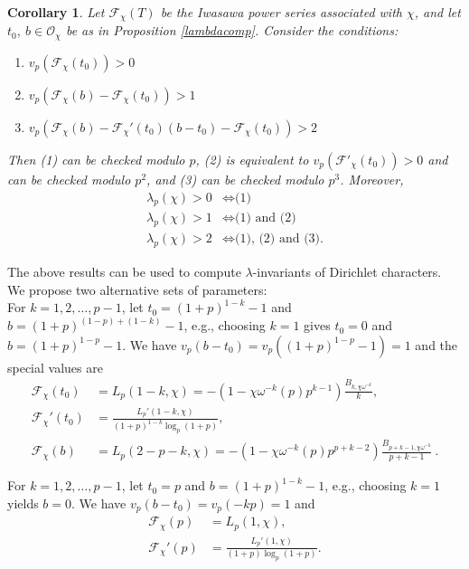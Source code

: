 \documentclass[pdflatex,sn-mathphys-num]{sn-jnl}%
\theoremstyle{plain}
\newtheorem{cor}[thm]{Corollary}
\theoremstyle{definition}
\theoremstyle{remark}
\numberwithin{equation}{section}
\begin{document}
\begin{cor} Let $\mathcal{F}_{\chi}(T)$ be the  Iwasawa power series associated with $\chi$, and let $t_0, \ b \in \mathcal{O}_{\chi}$ be as in Proposition \ref{lambdacomp}.
Consider the conditions:\\
\begin{enumerate}
\item[(1)]   $v_p(\mathcal{F}_{\chi}(t_0)) > 0$ 
\item[(2)] $v_p(\mathcal{F}_{\chi}(b)-\mathcal{F}_{\chi}(t_0)) > 1$
\item[(3)]  $v_p(\mathcal{F}_{\chi}(b)- \mathcal{F}_{\chi}'(t_0) (b-t_0) - \mathcal{F}_{\chi}(t_0)) > 2$
\end{enumerate}
Then (1) can be checked modulo $p$, (2) is equivalent to $v_p(\mathcal{F}'_{\chi}(t_0)) > 0$ and can be checked
modulo $p^2$, and (3) can be checked modulo $p^3$. Moreover,
\begin{align*}
\lambda_p(\chi) > 0 & \Longleftrightarrow \text{(1)} \\
\lambda_p(\chi) > 1 & \Longleftrightarrow \text{(1) and  (2)} \\
\lambda_p(\chi) > 2 & \Longleftrightarrow \text{(1), (2) and (3).} 
\end{align*}
\label{lambda}
\end{cor}
The above results can be used to compute $\lambda$-invariants of Dirichlet characters. We propose two alternative sets of parameters:\\


  For $k=1,2,\dots, p-1$, let $t_0 = (1+p)^{1-k} - 1$ and $b=(1+p)^{(1-p)+(1-k)} - 1$, e.g., choosing $k=1$ gives $t_0 = 0$ and $b=(1+p)^{1-p}-1$.  We have $v_p(b-t_0)=v_p((1+p)^{1-p}-1)=1$ and the special values are
\begin{align}
\mathcal{F}_{\chi}(t_0) & =   L_p(1-k,\chi)= - (1-\chi\omega^{-k}(p)p^{k-1}) \frac{B_{k,\chi \omega^{-k}}}{k} , \label{F0} \\
\mathcal{F}_{\chi}'(t_0)& =  \frac{ L_p'(1-k,\chi)} { (1+p)^{1-k} \log_p ( 1+p) } , \label{FD0} \\
\mathcal{F}_{\chi}( b ) &= L_p ( 2-p-k, \chi) = - (1-\chi\omega^{-k}(p) p^{p+k-2}) \frac{B_{p+k-1,\chi \omega^{-k}}}{p+k-1} \ .  \label{FDD0} 
\end{align}

 For $k=1,2,\dots, p-1$, let $t_0 = p$ and $b=(1+p)^{1-k} - 1$, e.g., choosing $k=1$ yields $b=0$. We have $v_p(b-t_0)=v_p(-kp)=1$ and
\begin{align}
\mathcal{F}_{\chi}(p) & =   L_p(1,\chi) ,  \label{G0} \\
\mathcal{F}_{\chi}'(p) & =  \frac{ L_p'(1,\chi)} { (1+p) \log_p ( 1+p) } .
 \label{GD0} 
\end{align}
\end{document}
